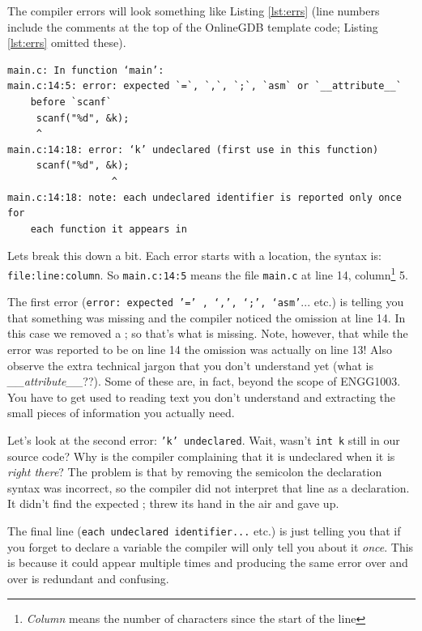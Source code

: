 \documentclass{lab}
\begin{document}
	The compiler errors will look something like Listing \ref{lst:errs} (line numbers include the comments at the top of the OnlineGDB template code; Listing \ref{lst:errs} omitted these).
	
	\begin{lstlisting}[caption=The multiple errors produced by removing a \textit{single} semicolon.,label=lst:errs,basicstyle=\ttfamily,frame=single]
main.c: In function ‘main’:
main.c:14:5: error: expected `=`, `,`, `;`, `asm` or `__attribute__`
	before `scanf`
     scanf("%d", &k);
     ^
main.c:14:18: error: ‘k’ undeclared (first use in this function)
     scanf("%d", &k);
                  ^
main.c:14:18: note: each undeclared identifier is reported only once for
	each function it appears in
	\end{lstlisting}

	
Lets break this down a bit. Each error starts with a location, the syntax is: \texttt{{file}:{line}:{column}}. So \texttt{main.c:14:5} means the file \texttt{main.c} at line 14, column\footnote{\textit{Column} means the number of characters since the start of the line} 5.

The first error (\texttt{error: expected '=' , ‘,’, ‘;’, ‘asm'}... etc.) is telling you that something was missing and the compiler noticed the omission at line 14. In this case we removed a ; so that's what is missing. Note, however, that while the error was reported to be on line 14 the omission was actually on line 13! Also observe the extra technical jargon that you don't understand yet (what is \textit{\_\_attribute\_\_}??). Some of these are, in fact, beyond the scope of ENGG1003. You have to get used to reading text you don't understand and extracting the small pieces of information you actually need.

Let's look at the second error: \texttt{'k' undeclared}. Wait, wasn't \texttt{int k} still in our source code? Why is the compiler complaining that it is undeclared when it is \textit{right there}? The problem is that by removing the semicolon the declaration syntax was incorrect, so the compiler did not interpret that line as a declaration. It didn't find the expected ; threw its hand in the air and gave up.

The final line (\texttt{each undeclared identifier...} etc.) is just telling you that if you forget to declare a variable the compiler will only tell you about it \textit{once}. This is because it could appear multiple times and producing the same error over and over is redundant and confusing.
\end{document}
